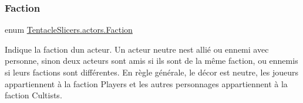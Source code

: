 \subsubsection{\texorpdfstring{Faction}{Faction}}
{\footnotesize\ttfamily enum \hyperlink{namespace_tentacle_slicers_1_1actors_aaae1293c828d51288c24ab9156ff5475}{Tentacle\+Slicers.\+actors.\+Faction}\hspace{0.3cm}{\ttfamily [strong]}}



Indique la faction d\textquotesingle{}un acteur. Un acteur neutre n\textquotesingle{}est allié ou ennemi avec personne, sinon deux acteurs sont amis si ils sont de la même faction, ou ennemis si leurs factions sont différentes. En règle générale, le décor est neutre, les joueurs appartiennent à la faction Players et les autres personnages appartiennent à la faction Cultists. 


